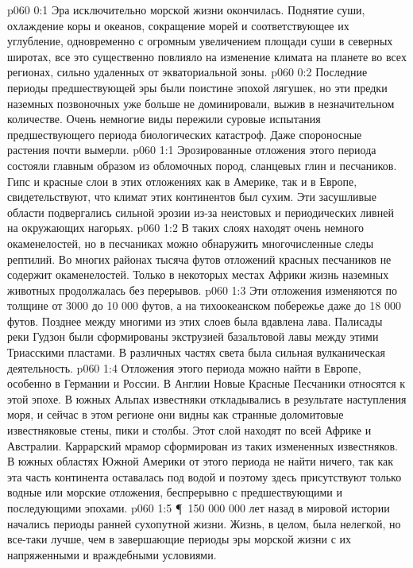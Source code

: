 \vs p060 0:1 Эра исключительно морской жизни окончилась. Поднятие суши, охлаждение коры и океанов, сокращение морей и соответствующее их углубление, одновременно с огромным увеличением площади суши в северных широтах, все это существенно повлияло на изменение климата на планете во всех регионах, сильно удаленных от экваториальной зоны.
\vs p060 0:2 Последние периоды предшествующей эры были поистине эпохой лягушек, но эти предки наземных позвоночных уже больше не доминировали, выжив в незначительном количестве. Очень немногие виды пережили суровые испытания предшествующего периода биологических катастроф. Даже спороносные растения почти вымерли.
\vs p060 1:1 Эрозированные отложения этого периода состояли главным образом из обломочных пород, сланцевых глин и песчаников. Гипс и красные слои в этих отложениях как в Америке, так и в Европе, свидетельствуют, что климат этих континентов был сухим. Эти засушливые области подвергались сильной эрозии из\hyp{}за неистовых и периодических ливней на окружающих нагорьях.
\vs p060 1:2 В таких слоях находят очень немного окаменелостей, но в песчаниках можно обнаружить многочисленные следы рептилий. Во многих районах тысяча футов отложений красных песчаников не содержит окаменелостей. Только в некоторых местах Африки жизнь наземных животных продолжалась без перерывов.
\vs p060 1:3 Эти отложения изменяются по толщине от 3000 до 10 000 футов, а на тихоокеанском побережье даже до 18 000 футов. Позднее между многими из этих слоев была вдавлена лава. Палисады реки Гудзон были сформированы экструзией базальтовой лавы между этими Триасскими пластами. В различных частях света была сильная вулканическая деятельность.
\vs p060 1:4 Отложения этого периода можно найти в Европе, особенно в Германии и России. В Англии Новые Красные Песчаники относятся к этой эпохе. В южных Альпах известняки откладывались в результате наступления моря, и сейчас в этом регионе они видны как странные доломитовые известняковые стены, пики и столбы. Этот слой находят по всей Африке и Австралии. Каррарский мрамор сформирован из таких измененных известняков. В южных областях Южной Америки от этого периода не найти ничего, так как эта часть континента оставалась под водой и поэтому здесь присутствуют только водные или морские отложения, беспрерывно с предшествующими и последующими эпохами.
\vs p060 1:5 \P\ 150 000 000 лет назад в мировой истории начались периоды ранней сухопутной жизни. Жизнь, в целом, была нелегкой, но все\hyp{}таки лучше, чем в завершающие периоды эры морской жизни с их напряженными и враждебными условиями.

